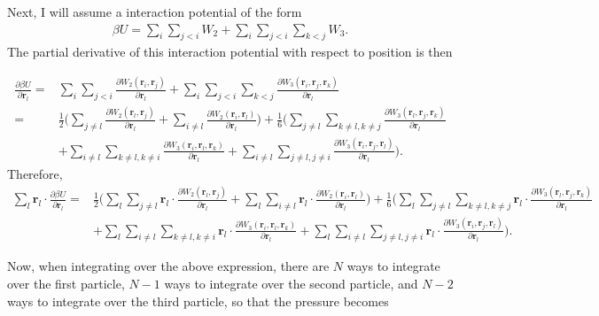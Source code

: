 \documentclass[../main.tex]{subfiles}
\begin{document}
Next, I will assume a interaction potential of the form
\begin{align}
  \beta U = \sum_{i}\sum_{j<i}W_2+\sum_{i}\sum_{j<i}\sum_{k<j}W_3.
\end{align}
The partial derivative of this interaction potential with respect
to position is then
\begin{widetext}
  \begin{align}
    \frac{\partial \beta U}{\partial \bm{r}_l}
    =& \sum_{i}\sum_{j<i}
    \frac{\partial W_2(\bm{r}_i,\bm{r}_j)}{\partial \bm{r}_l}
    +\sum_{i}\sum_{j<i}\sum_{k<j}
    \frac{\partial W_3(\bm{r}_i,\bm{r}_j,\bm{r}_k)}{\partial \bm{r}_l}
    \nonumber\\
    =& \frac{1}{2}\bigg(\sum_{j\neq l}
    \frac{\partial W_2(\bm{r}_l,\bm{r}_j)}{\partial \bm{r}_l}
    +\sum_{i\neq l}
    \frac{\partial W_2(\bm{r}_i,\bm{r}_l)}{\partial \bm{r}_l}\bigg)
    +\frac{1}{6}\bigg(\sum_{j\neq l}\sum_{k\neq l,k\neq j}
    \frac{\partial W_3(\bm{r}_l,\bm{r}_j,\bm{r}_k)}{\partial \bm{r}_l}
    \nonumber\\
    &+\sum_{i\neq l}\sum_{k\neq l, k\neq i}
    \frac{\partial W_3(\bm{r}_i,\bm{r}_l,\bm{r}_k)}{\partial \bm{r}_l}
    +\sum_{i\neq l}\sum_{j\neq l,j\neq i}
    \frac{\partial W_3(\bm{r}_i,\bm{r}_j,\bm{r}_l)}{\partial \bm{r}_l}
    \bigg).
  \end{align}
  Therefore,
  \begin{align}
    \sum_l\bm{r}_l\cdot\frac{\partial \beta U}{\partial \bm{r}_l}
    =&\frac{1}{2}\bigg(\sum_l\sum_{j\neq l}\bm{r}_l\cdot
    \frac{\partial W_2(\bm{r}_l,\bm{r}_j)}{\partial \bm{r}_l}
    +\sum_l\sum_{i\neq l}\bm{r}_l\cdot
    \frac{\partial W_2(\bm{r}_i,\bm{r}_l)}{\partial \bm{r}_l}\bigg)
    +\frac{1}{6}\bigg(\sum_l\sum_{j\neq l}\sum_{k\neq l,k\neq j}
    \bm{r}_l\cdot
    \frac{\partial W_3(\bm{r}_l,\bm{r}_j,\bm{r}_k)}{\partial \bm{r}_l}
    \nonumber\\
    &+\sum_l\sum_{i\neq l}\sum_{k\neq l, k\neq i}\bm{r}_l\cdot
    \frac{\partial W_3(\bm{r}_i,\bm{r}_l,\bm{r}_k)}{\partial \bm{r}_l}
    +\sum_l\sum_{i\neq l}\sum_{j\neq l,j\neq i}\bm{r}_l\cdot
    \frac{\partial W_3(\bm{r}_i,\bm{r}_j,\bm{r}_l)}{\partial \bm{r}_l}
    \bigg).
  \end{align}
\end{widetext}
Now, when integrating over the above expression, there are $N$ ways to
integrate over the first particle, $N-1$ ways to integrate over the
second particle, and $N-2$ ways to integrate over the third particle,
so that the pressure becomes
\end{document}
